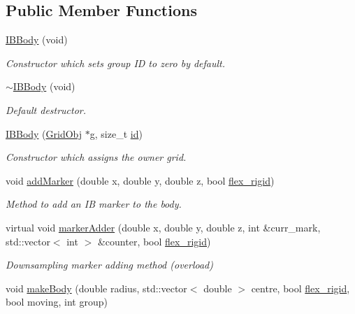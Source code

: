 \subsection*{Public Member Functions}
\begin{DoxyCompactItemize}
\item 
\hyperlink{class_i_b_body_a5fbec47db22b9d525724f232d1d81037}{I\+B\+Body} (void)
\begin{DoxyCompactList}\small\item\em Constructor which sets group ID to zero by default. \end{DoxyCompactList}\item 
\hyperlink{class_i_b_body_afe26e702d31e91f562aecd04a5f5c7f0}{$\sim$\+I\+B\+Body} (void)
\begin{DoxyCompactList}\small\item\em Default destructor. \end{DoxyCompactList}\item 
\hyperlink{class_i_b_body_a737e9f9ecfff9a1ea0741b03a43c3478}{I\+B\+Body} (\hyperlink{class_grid_obj}{Grid\+Obj} $\ast$g, size\+\_\+t \hyperlink{class_body_a9d5166d7419f303190b6c6543e67e815}{id})
\begin{DoxyCompactList}\small\item\em Constructor which assigns the owner grid. \end{DoxyCompactList}\item 
void \hyperlink{class_i_b_body_aafa9573e6787bf3b6f07fd3880452b89}{add\+Marker} (double x, double y, double z, bool \hyperlink{class_i_b_body_a526f3e83b45b991a79941ee745698ea5}{flex\+\_\+rigid})
\begin{DoxyCompactList}\small\item\em Method to add an IB marker to the body. \end{DoxyCompactList}\item 
virtual void \hyperlink{class_i_b_body_a16cf21facacb49727c2e1feda473d080}{marker\+Adder} (double x, double y, double z, int \&curr\+\_\+mark, std\+::vector$<$ int $>$ \&counter, bool \hyperlink{class_i_b_body_a526f3e83b45b991a79941ee745698ea5}{flex\+\_\+rigid})
\begin{DoxyCompactList}\small\item\em Downsampling marker adding method (overload) \end{DoxyCompactList}\item 
void \hyperlink{class_i_b_body_af26b0107e612dab7cd1e73bac1f4f234}{make\+Body} (double radius, std\+::vector$<$ double $>$ centre, bool \hyperlink{class_i_b_body_a526f3e83b45b991a79941ee745698ea5}{flex\+\_\+rigid}, bool moving, int group)

\end{DoxyCompactItemize}
